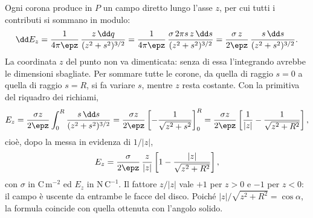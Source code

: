 \documentclass[main.tex]{subfiles}
\begin{document}
Ogni corona produce in $P$ un campo diretto lungo l'asse $z$, per cui tutti i contributi si sommano in modulo:
\[
\dd E_z=\frac{1}{4\pi\epz}\,\frac{z\,\dd q}{(z^2+s^2)^{3/2}}=\frac{1}{4\pi\epz}\,\frac{\sigma\,2\pi s\,z\,\dd s}{(z^2+s^2)^{3/2}}=\frac{\sigma\,z}{2\epz}\,\frac{s\,\dd s}{(z^2+s^2)^{3/2}} .
\]
La coordinata $z$ del punto non va dimenticata: senza di essa l'integrando avrebbe le dimensioni sbagliate. Per sommare tutte le corone, da quella di raggio $s=0$ a quella di raggio $s=R$, si fa variare $s$, mentre $z$ resta costante. Con la primitiva del riquadro dei richiami,
\[
E_z=\frac{\sigma z}{2\epz}\int_0^R\frac{s\,\dd s}{(z^2+s^2)^{3/2}}=\frac{\sigma z}{2\epz}\left[-\frac{1}{\sqrt{z^2+s^2}}\right]_0^R=\frac{\sigma z}{2\epz}\left[\frac{1}{|z|}-\frac{1}{\sqrt{z^2+R^2}}\right],
\]
cioè, dopo la messa in evidenza di $1/|z|$,
\[
E_z=\frac{\sigma}{2\epz}\,\frac{z}{|z|}\left[1-\frac{|z|}{\sqrt{z^2+R^2}}\right] ,
\]
con $\sigma$ in $\mathrm{C\,m^{-2}}$ ed $E_z$ in $\mathrm{N\,C^{-1}}$. Il fattore $z/|z|$ vale $+1$ per $z>0$ e $-1$ per $z<0$: il campo è uscente da entrambe le facce del disco. Poiché $|z|/\sqrt{z^2+R^2}=\cos\alpha$, la formula coincide con quella ottenuta con l'angolo solido.
\end{document}
